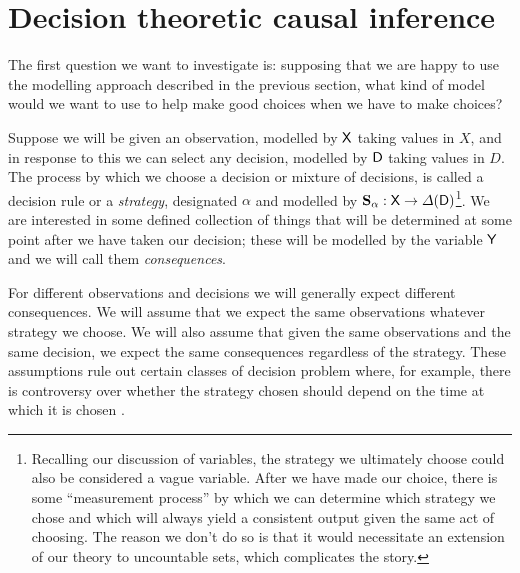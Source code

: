 
\section{Decision theoretic causal inference}\label{sec:seedo_models}

The first question we want to investigate is: supposing that we are happy to use the modelling approach described in the previous section, what kind of model would we want to use to help make good choices when we have to make choices?

Suppose we will be given an observation, modelled by $\mathsf{X}$ taking values in $X$, and in response to this we can select any decision, modelled by $\mathsf{D}$ taking values in $D$. The process by which we choose a decision or mixture of decisions, is called a decision rule or a \emph{strategy}, designated $\alpha$ and modelled by $\mathbf{S}_\alpha:\mathsf{X}\to \Delta(\mathsf{D})$\footnote{Recalling our discussion of variables, the strategy we ultimately choose could also be considered a vague variable. After we have made our choice, there is some ``measurement process'' by which we can determine which strategy we chose and which will always yield a consistent output given the same act of choosing. The reason we don't do so is that it would necessitate an extension of our theory to uncountable sets, which complicates the story.}. We are interested in some defined collection of things that will be determined at some point after we have taken our decision; these will be modelled by the variable $\mathsf{Y}$ and we will call them \emph{consequences}.

For different observations and decisions we will generally expect different consequences. We will assume that we expect the same observations whatever strategy we choose. We will also assume that given the same observations and the same decision, we expect the same consequences regardless of the strategy. These assumptions rule out certain classes of decision problem where, for example, there is controversy over whether the strategy chosen should depend on the time at which it is chosen \citet{weirich_causal_2016,lewis_causal_1981,paul_f_christiano_edt_2018}.

